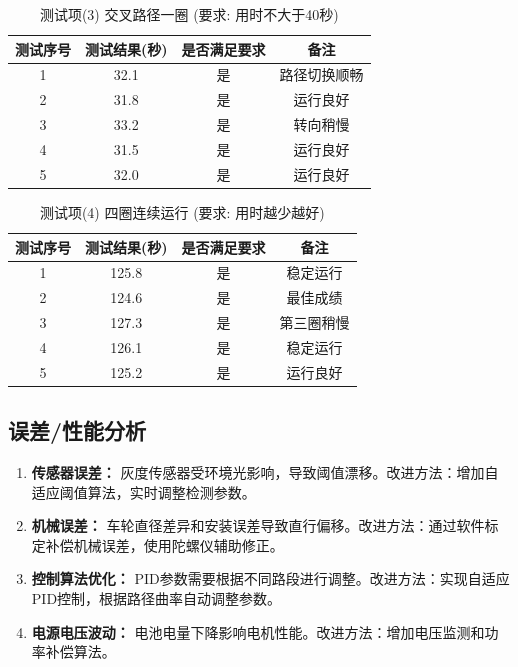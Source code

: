 \documentclass[UTF8]{ctexart}
\begin{document}
\begin{table}[H]
    \centering
    \caption{测试项(3) 交叉路径一圈 (要求: 用时不大于40秒)}
    \label{tab:task3}
    \begin{tabular}{cccc}
        \toprule
        测试序号 & 测试结果(秒) & 是否满足要求 & 备注 \\
        \midrule
        1 & 32.1 & 是 & 路径切换顺畅 \\
        2 & 31.8 & 是 & 运行良好 \\
        3 & 33.2 & 是 & 转向稍慢 \\
        4 & 31.5 & 是 & 运行良好 \\
        5 & 32.0 & 是 & 运行良好 \\
        \bottomrule
    \end{tabular}
\end{table}

\begin{table}[H]
    \centering
    \caption{测试项(4) 四圈连续运行 (要求: 用时越少越好)}
    \label{tab:task4}
    \begin{tabular}{cccc}
        \toprule
        测试序号 & 测试结果(秒) & 是否满足要求 & 备注 \\
        \midrule
        1 & 125.8 & 是 & 稳定运行 \\
        2 & 124.6 & 是 & 最佳成绩 \\
        3 & 127.3 & 是 & 第三圈稍慢 \\
        4 & 126.1 & 是 & 稳定运行 \\
        5 & 125.2 & 是 & 运行良好 \\
        \bottomrule
    \end{tabular}
\end{table}

\subsection{误差/性能分析}

\begin{enumerate}
    \item \textbf{传感器误差：} 灰度传感器受环境光影响，导致阈值漂移。改进方法：增加自适应阈值算法，实时调整检测参数。
    
    \item \textbf{机械误差：} 车轮直径差异和安装误差导致直行偏移。改进方法：通过软件标定补偿机械误差，使用陀螺仪辅助修正。
    
    \item \textbf{控制算法优化：} PID参数需要根据不同路段进行调整。改进方法：实现自适应PID控制，根据路径曲率自动调整参数。
    
    \item \textbf{电源电压波动：} 电池电量下降影响电机性能。改进方法：增加电压监测和功率补偿算法。
\end{enumerate}
\end{document}
